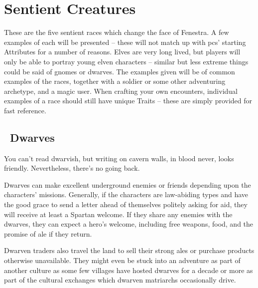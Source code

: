 \section[Sentient Creatures]{Sentient Creatures \E}

\begin{multicols}{2}

\noindent
These are the five sentient races which change the face of Fenestra.
A few examples of each will be presented -- these will not match up with \glspl{pc}' starting Attributes for a number of reasons.
Elves are very long lived, but players will only be able to portray young elven characters -- similar but less extreme things could be said of gnomes or dwarves.
The examples given will be of common examples of the races, together with a soldier or some other adventuring archetype, and a magic user.
When crafting your own encounters, individual examples of a race should still have unique Traits -- these are simply provided for fast reference.

\subsection[Dwarves]{\Dw\ Dwarves}
\label{best_dwarves}

\begin{boxtext}

  You can't read dwarvish, but writing on cavern walls, in blood never, looks friendly.
  Nevertheless, there's no going back.

\end{boxtext}

Dwarves can make excellent underground enemies or friends depending upon the characters' missions.
Generally, if the characters are law-abiding types and have the good grace to send a letter ahead of themselves politely asking for aid, they will receive at least a Spartan welcome.
If they share any enemies with the dwarves, they can expect a hero's welcome, including free weapons, food, and the promise of ale if they return.

Dwarven traders also travel the land to sell their strong ales or purchase products otherwise unavailable.
They might even be stuck into an adventure as part of another culture as some few villages have hosted dwarves for a decade or more as part of the cultural exchanges which dwarven matriarchs occasionally drive.

\begin{boxtext}


\end{boxtext}
\end{multicols}
